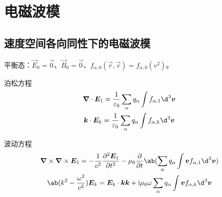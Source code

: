 \section{电磁波模}

\subsection{速度空间各向同性下的电磁波模}

平衡态：$\vec{E}_0=\vec{0}$、$\vec{B}_0=\vec{0}$、$f_{\alpha,0}(\vec{r},\vec{v})=f_{\alpha,0}(v^2)$。

泊松方程
\begin{equation}\begin{gathered}
\dive{\vec{E}_1} = \frac{1}{\varepsilon_0}
\sum_\alpha q_\alpha \int f_{\alpha,1} \d^3\vec{v} \\
\vec{k} \cdot \vec{E}_k
= \frac{1}{\varepsilon_0}
\sum_\alpha q_\alpha \int f_{\alpha,k} \d^3\vec{v}
\end{gathered}\end{equation}

波动方程
\begin{equation}\begin{gathered}
\curl{\curl{\vec{E}_1}} =
- \frac{1}{c^2} \pdv[2]{\vec{E}_1}{t}
- \mu_0 \pdv*{\ab(
    \sum_\alpha q_\alpha \int \vec{v} f_{\alpha,1} \d^3\vec{v}
)}{t} \\
\ab(k^2 - \frac{\omega^2}{c^2}) \vec{E}_k
= \vec{E}_k\cdot\vec{k}\vec{k} + \im\mu_0\omega
    \sum_\alpha q_\alpha \int \vec{v} f_{\alpha,k} \d^3\vec{v}
\end{gathered}\end{equation}

